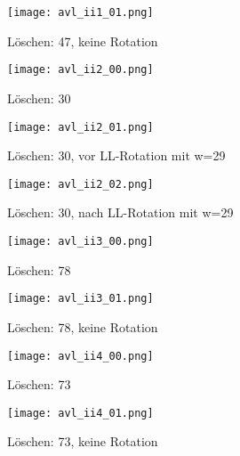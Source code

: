 \documentclass[a4paper]{article}
\begin{document}
\begin{figure}[!h]
	\begin{center}
		\texttt{[image: avl\_ii1\_01.png]}
	\end{center}
	\caption{Löschen: 47, keine Rotation}
	\label{fig:avl_ii1_01}
\end{figure}

\begin{figure}[!h]
	\begin{center}
		\texttt{[image: avl\_ii2\_00.png]}
	\end{center}
	\caption{Löschen: 30}
	\label{fig:avl_ii2_00}
\end{figure}

\begin{figure}[!h]
	\begin{center}
		\texttt{[image: avl\_ii2\_01.png]}
	\end{center}
	\caption{Löschen: 30, vor LL-Rotation mit w=29}
	\label{fig:avl_ii2_01}
\end{figure}

\begin{figure}[!h]
	\begin{center}
		\texttt{[image: avl\_ii2\_02.png]}
	\end{center}
	\caption{Löschen: 30, nach LL-Rotation mit w=29}
	\label{fig:avl_ii2_02}
\end{figure}

\begin{figure}[!h]
	\begin{center}
		\texttt{[image: avl\_ii3\_00.png]}
	\end{center}
	\caption{Löschen: 78}
	\label{fig:avl_ii3_00}
\end{figure}

\begin{figure}[!h]
	\begin{center}
		\texttt{[image: avl\_ii3\_01.png]}
	\end{center}
	\caption{Löschen: 78, keine Rotation}
	\label{fig:avl_ii3_01}
\end{figure}

\begin{figure}[!h]
	\begin{center}
		\texttt{[image: avl\_ii4\_00.png]}
	\end{center}
	\caption{Löschen: 73}
	\label{fig:avl_ii4_00}
\end{figure}

\begin{figure}[!h]
	\begin{center}
		\texttt{[image: avl\_ii4\_01.png]}
	\end{center}
	\caption{Löschen: 73, keine Rotation}
	\label{fig:avl_ii4_01}
\end{figure}
\end{document}
